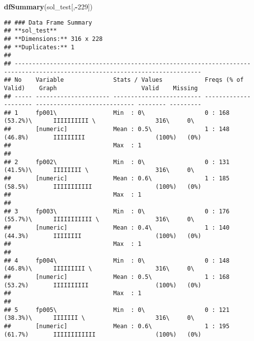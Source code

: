 \documentclass[]{article}
\newenvironment{Shaded}{\begin{snugshade}}{\end{snugshade}}
\newcommand{\DecValTok}[1]{\textcolor[rgb]{0.00,0.00,0.81}{#1}}
\newcommand{\KeywordTok}[1]{\textcolor[rgb]{0.13,0.29,0.53}{\textbf{#1}}}
\newcommand{\NormalTok}[1]{#1}
\newcommand{\OperatorTok}[1]{\textcolor[rgb]{0.81,0.36,0.00}{\textbf{#1}}}
\begin{document}
\begin{Shaded}
\begin{Highlighting}[]
\KeywordTok{dfSummary}\NormalTok{(sol_test[,}\OperatorTok{-}\DecValTok{229}\NormalTok{])}
\end{Highlighting}
\end{Shaded}

\begin{verbatim}
## ### Data Frame Summary  
## **sol_test**   
## **Dimensions:** 316 x 228  
## **Duplicates:** 1  
## 
## ---------------------------------------------------------------------------------------------------------------------------
## No    Variable              Stats / Values            Freqs (% of Valid)    Graph                        Valid    Missing  
## ----- --------------------- ------------------------- --------------------- ---------------------------- -------- ---------
## 1     fp001\                Min  : 0\                 0 : 168 (53.2%)\      IIIIIIIIII \                 316\     0\       
##       [numeric]             Mean : 0.5\               1 : 148 (46.8%)       IIIIIIIII                    (100%)   (0%)     
##                             Max  : 1                                                                                       
## 
## 2     fp002\                Min  : 0\                 0 : 131 (41.5%)\      IIIIIIII \                   316\     0\       
##       [numeric]             Mean : 0.6\               1 : 185 (58.5%)       IIIIIIIIIII                  (100%)   (0%)     
##                             Max  : 1                                                                                       
## 
## 3     fp003\                Min  : 0\                 0 : 176 (55.7%)\      IIIIIIIIIII \                316\     0\       
##       [numeric]             Mean : 0.4\               1 : 140 (44.3%)       IIIIIIII                     (100%)   (0%)     
##                             Max  : 1                                                                                       
## 
## 4     fp004\                Min  : 0\                 0 : 148 (46.8%)\      IIIIIIIII \                  316\     0\       
##       [numeric]             Mean : 0.5\               1 : 168 (53.2%)       IIIIIIIIII                   (100%)   (0%)     
##                             Max  : 1                                                                                       
## 
## 5     fp005\                Min  : 0\                 0 : 121 (38.3%)\      IIIIIII \                    316\     0\       
##       [numeric]             Mean : 0.6\               1 : 195 (61.7%)       IIIIIIIIIIII                 (100%)   (0%)     

\end{verbatim}
\end{document}
